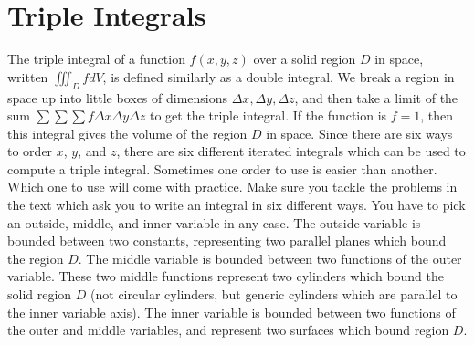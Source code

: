 \section{Triple Integrals}
%
The triple integral of a function $f(x,y,z)$ over a solid region $D$
in space, written $\iiint_D f dV$, is defined similarly as a double
integral.  We break a region in space up into little boxes of
dimensions $\Delta x,\Delta y, \Delta z$, and then take a limit of the sum $\sum\sum\sum f\Delta x\Delta
y \Delta z$ to get the triple integral. If the function is $f=1$, then this
integral gives the volume of the region $D$ in space. Since there are
six ways to order $x$, $y$, and $z$, there are six different iterated
integrals which can be used to compute a triple integral. Sometimes
one order to use is easier than another.  Which one to use will come
with practice. Make sure you tackle the problems in the text which ask
you to write an integral in six different ways. You have to pick an
outside, middle, and inner variable in any case.  The outside variable
is bounded between two constants, representing two parallel planes
which bound the region $D$.  The middle variable is bounded between
two functions of the outer variable.  These two middle functions
represent two cylinders which bound the solid region $D$ (not circular
cylinders, but generic cylinders which are parallel to the inner
variable axis). The inner variable is bounded between two functions of
the outer and middle variables, and represent two surfaces which bound
region $D$. 

